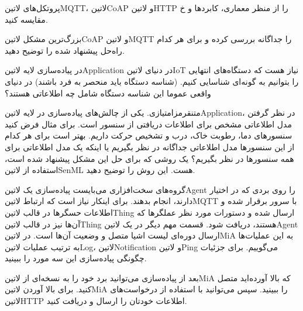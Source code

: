 \documentclass[]{assignment}
\begin{document}

 
 


 پروتکل‌های ‌لاتین{MQTT}، ‌لاتین{CoAP} و ‌لاتین{HTTP} را از منظر معماری، کابردها و ‌خ مقایسه کنید.

 بزرگ‌ترین مشکل ‌لاتین{CoAP} و ‌لاتین{MQTT} را جداگانه بررسی کرده و برای هر کدام راه‌حل پیشنهاد شده را توضیح دهید.

 در پیاده‌سازی لایه ‌لاتین{Application} در دنیای ‌لاتین{IoT} نیاز هست که دستگاه‌های انتهایی را بتوانیم به گونه‌ای شناسایی کنیم. (شناسه دستگاه‌ باید منحصر به فرد باشند) در دنیای واقعی عموما این شناسه دستگاه‌ شامل چه اطلاعاتی هستند؟

 ‌متن{قرمز}{امتیازی.} یکی از چالش‌های پیاده‌سازی در لایه ‌لاتین{Application}، در نظر گرفتن مدل اطلاعاتی مشخص برای اطلاعات دریافتی از سنسور است.
برای مثال فرض کنید سنسور‌های دما، رطوبت خاک، درب و تشخیص حرکت داریم. بهتر است برای هر کدام از این سنسورها مدل اطلاعاتی جداگانه در نظر بگیریم یا اینکه یک مدل اطلاعاتی برای همه سنسور‌ها در نظر بگیریم؟
یک روشی که برای حل این مشکل پیشنهاد شده است، استفاده از ‌لاتین{SenML} هست. این روش را توضیح دهید.


گروه‌های سخت‌افزاری می‌بایست پیاده‌سازی یک ‌لاتین{Agent} را روی بردی که در اختیار دارند، انجام بدهند.
برای اینکار نیاز است که ارتباط ‌لاتین{MQTT}
با سرور برقرار شده و اطلاعات حسگرها در قالب ‌لاتین{Thing} ارسال شده و دستورات مورد نظر عملگرها که آن‌ها نیز در قالب ‌لاتین{Thing} هستند، دریافت شود.
قسمت مهم دیگر در یک ‌لاتین{Agent} ارسال دوره‌ای لیست اشیا متصل و وضعیت آن‌ها است. در ‌لاتین{MiA} به این عملیات‌ها به ترتیب عملیات
‌لاتین{Log}، ‌لاتین{Notification} و ‌لاتین{Ping} می‌گوییم.
برای جزئیات چگونگی پیاده‌سازی این سه مورد  را ببینید.

بعد از پیاده‌سازی می‌توانید برد خود را به نسخه‌ای از ‌لاتین{MiA} که بالا آورده‌اید متصل کنید.
برای بالا آوردن ‌لاتین{MiA}  را ببینید.
سپس می‌توانید با استفاده از درخواست‌های ‌لاتین{HTTP} اطلاعات خودتان را ارسال و دریافت کنید.
\end{document}
